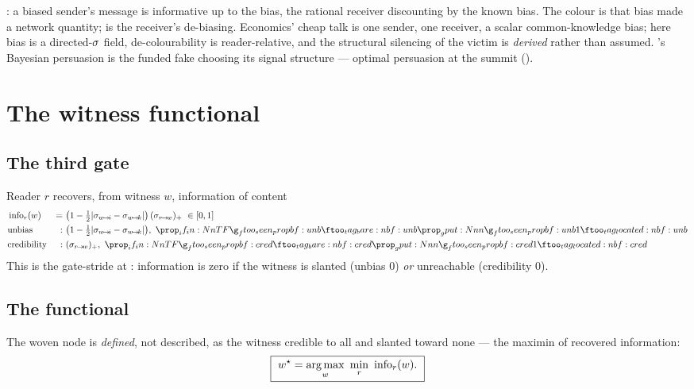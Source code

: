\documentclass[../main]{subfiles}
\begin{document}
\begin{econ}[label=e:colour, title={Cheap talk as a directed field}, ref=pr:colour,
  cites={a:crawfordsobel}, departs=flatten,
  stopsat={one sender, one receiver, a scalar bias; here a directed field, de-colourability reader-relative, the silencing derived}]
  \textcite{a:crawfordsobel}: a biased sender's message is informative up to the bias, the
  rational receiver discounting by the known bias. The colour is that bias made a network
  quantity;  is the receiver's de-biasing. Economics' cheap talk is one sender,
  one receiver, a scalar common-knowledge bias; here bias is a directed-$\sigma$ field,
  de-colourability is reader-relative, and the structural silencing of the victim is
  \emph{derived} rather than assumed. \textcite{a:kamenica}'s Bayesian persuasion is the
  funded fake choosing its signal structure --- optimal persuasion at the summit
  ().
\end{econ}

\clearpage
\section{The witness functional}
\label{sec:witness-functional}

\subsection{The third gate}
\label{subsec:wit:gate}
%
\begin{definition}
  Reader $r$ recovers, from witness $w$, information of content
  \begin{align}
  &\info_r(w) &=& \ \bigl(1-\tfrac12|\lean{w}{i}-\lean{w}{k}|\bigr)\,
                  (\lean{r}{w})_{+}\ \in[0,1] \label{eq:pr:info}\\
  &\text{unbias}      &:& \ \bigl(1-\tfrac12|\lean{w}{i}-\lean{w}{k}|\bigr),\ \ftag{bf:unb}
    \label{eq:pr:info-unb}\\
  &\text{credibility} &:& \ (\lean{r}{w})_{+},\ \ftag{bf:cred}
    \label{eq:pr:info-cred}
  \end{align}
  This is the gate-stride  at : information is zero if the witness
  is slanted (unbias $0$) \emph{or} unreachable (credibility $0$).
\end{definition}

\subsection{The functional}
\label{subsec:wit:functional}
%
\begin{definition}
  The woven node is \emph{defined}, not described, as the witness credible to all and slanted
  toward none --- the maximin of recovered information:
  \begin{equation}
    \boxed{\ w^\star=\argmax_{w}\ \min_{r}\ \info_r(w).\ }
    \label{eq:pr:woven}
  \end{equation}
\end{definition}
\end{document}
